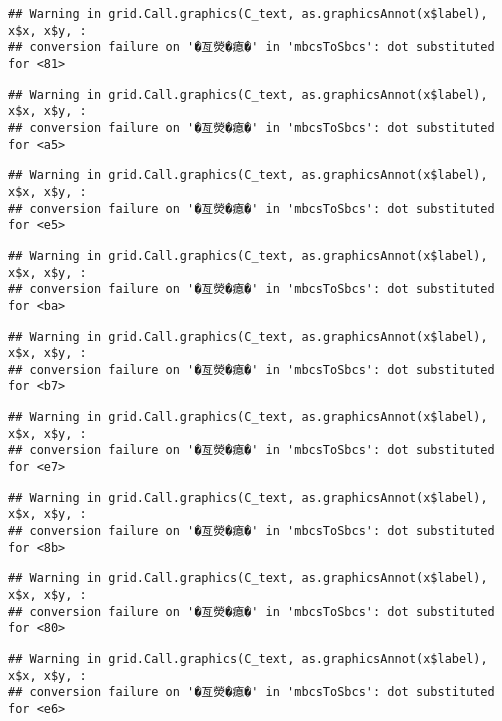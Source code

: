 \documentclass[
]{article}
\begin{document}
\begin{verbatim}
## Warning in grid.Call.graphics(C_text, as.graphicsAnnot(x$label), x$x, x$y, :
## conversion failure on '�亙熒�瘜�' in 'mbcsToSbcs': dot substituted for <81>
\end{verbatim}

\begin{verbatim}
## Warning in grid.Call.graphics(C_text, as.graphicsAnnot(x$label), x$x, x$y, :
## conversion failure on '�亙熒�瘜�' in 'mbcsToSbcs': dot substituted for <a5>
\end{verbatim}

\begin{verbatim}
## Warning in grid.Call.graphics(C_text, as.graphicsAnnot(x$label), x$x, x$y, :
## conversion failure on '�亙熒�瘜�' in 'mbcsToSbcs': dot substituted for <e5>
\end{verbatim}

\begin{verbatim}
## Warning in grid.Call.graphics(C_text, as.graphicsAnnot(x$label), x$x, x$y, :
## conversion failure on '�亙熒�瘜�' in 'mbcsToSbcs': dot substituted for <ba>
\end{verbatim}

\begin{verbatim}
## Warning in grid.Call.graphics(C_text, as.graphicsAnnot(x$label), x$x, x$y, :
## conversion failure on '�亙熒�瘜�' in 'mbcsToSbcs': dot substituted for <b7>
\end{verbatim}

\begin{verbatim}
## Warning in grid.Call.graphics(C_text, as.graphicsAnnot(x$label), x$x, x$y, :
## conversion failure on '�亙熒�瘜�' in 'mbcsToSbcs': dot substituted for <e7>
\end{verbatim}

\begin{verbatim}
## Warning in grid.Call.graphics(C_text, as.graphicsAnnot(x$label), x$x, x$y, :
## conversion failure on '�亙熒�瘜�' in 'mbcsToSbcs': dot substituted for <8b>
\end{verbatim}

\begin{verbatim}
## Warning in grid.Call.graphics(C_text, as.graphicsAnnot(x$label), x$x, x$y, :
## conversion failure on '�亙熒�瘜�' in 'mbcsToSbcs': dot substituted for <80>
\end{verbatim}

\begin{verbatim}
## Warning in grid.Call.graphics(C_text, as.graphicsAnnot(x$label), x$x, x$y, :
## conversion failure on '�亙熒�瘜�' in 'mbcsToSbcs': dot substituted for <e6>
\end{verbatim}
\end{document}
